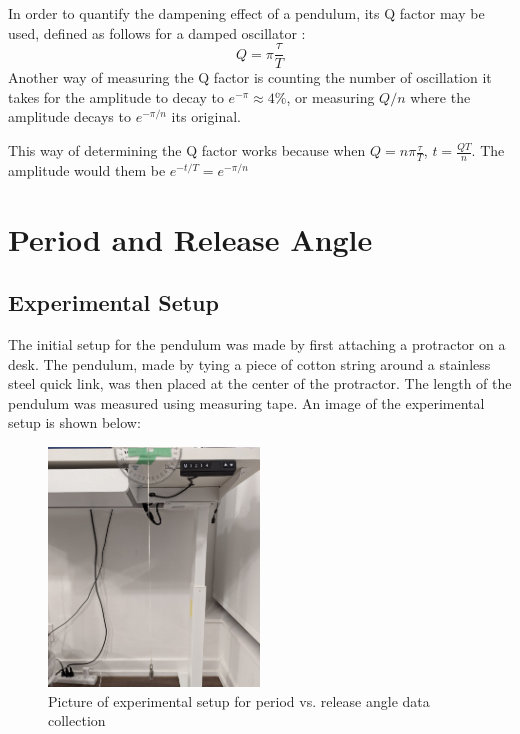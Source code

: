 \documentclass[12pt]{article}
\begin{document}
In order to quantify the dampening effect of a pendulum, its Q factor may be used, defined as follows for a damped oscillator \cite{pnp-physics}:
\begin{equation}
    Q = \pi\frac{\tau}{T}
\end{equation}
Another way of measuring the Q factor is counting the number of oscillation it takes for the amplitude to decay to $e^{-\pi} \approx 4\%$, or measuring $Q/n$ where the amplitude decays to $e^{-{\pi/n}}$ its original.

This way of determining the Q factor works because when $Q = n\pi\frac{\tau}{T}$, $t = \frac{QT}{n}$. The amplitude would them be $e^{-{t/T}} = e^{-{\pi/n}}$

\section{Period and Release Angle}

\subsection{Experimental Setup}
The initial setup for the pendulum was made by first attaching a protractor on a desk. The pendulum, made by tying a piece of cotton string around a stainless steel quick link, was then placed at the center of the protractor. The length of the pendulum was measured using measuring tape. An image of the experimental setup is shown below:

\begin{figure}[!hptb]
    \centering
    \includegraphics[width=0.5\textwidth]{../figures/exp_setup1.jpg}
    \caption{\centering Picture of experimental setup for period vs. release angle data collection}
    \label{fig:figure 1}
\end{figure}
\end{document}

